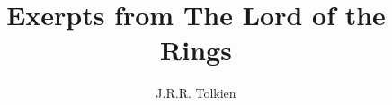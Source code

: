\documentclass[12pt]{book}
\begin{document}
\title{Exerpts from The Lord of the Rings}
\author{J.R.R. Tolkien}
\date{}
\maketitle
\clearpage


\tableofcontents




\end{document}
